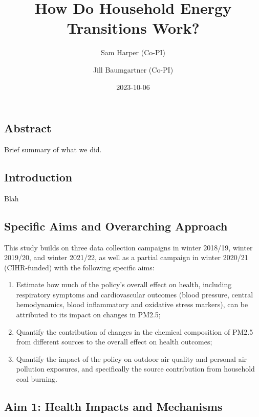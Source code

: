 \documentclass[
  letterpaper,
  DIV=11,
  numbers=noendperiod]{scrartcl}
\title{How Do Household Energy Transitions Work?}
\author{Sam Harper (Co-PI) \and Jill Baumgartner (Co-PI)}
\date{2023-10-06}
\renewcommand*\contentsname{Table of contents}
\newcommand\contentsname{Table of contents}
\begin{document}
\maketitle
\renewcommand*\contentsname{Table of contents}
{
\hypersetup{linkcolor=}
\setcounter{tocdepth}{3}
\tableofcontents
}
\subsection{Abstract}\label{abstract}

Brief summary of what we did.

\subsection{Introduction}\label{introduction}

Blah

\subsection{Specific Aims and Overarching
Approach}\label{specific-aims-and-overarching-approach}

This study builds on three data collection campaigns in winter 2018/19,
winter 2019/20, and winter 2021/22, as well as a partial campaign in
winter 2020/21 (CIHR-funded) with the following specific aims:

\begin{enumerate}
\def\labelenumi{\arabic{enumi}.}
\item
  Estimate how much of the policy's overall effect on health, including
  respiratory symptoms and cardiovascular outcomes (blood pressure,
  central hemodynamics, blood inflammatory and oxidative stress
  markers), can be attributed to its impact on changes in PM2.5;
\item
  Quantify the contribution of changes in the chemical composition of
  PM2.5 from different sources to the overall effect on health outcomes;
\item
  Quantify the impact of the policy on outdoor air quality and personal
  air pollution exposures, and specifically the source contribution from
  household coal burning.
\end{enumerate}

\subsection{Aim 1: Health Impacts and
Mechanisms}\label{aim-1-health-impacts-and-mechanisms}
\end{document}
